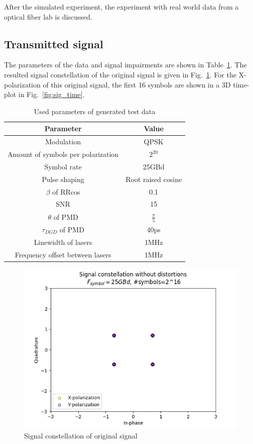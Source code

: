 \documentclass[journal,10pt,twoside, a4paper]{IEEEtran}
\begin{document}
After the simulated experiment, the experiment with real world data from a optical fiber lab is discussed.

\subsection{Transmitted signal}
The parameters of the data and signal impairments are shown in Table~\ref{tab:parameters}. The resulted signal constellation of the original signal is given in Fig.~\ref{fig:sig}. For the X-polarization of this original signal, the first 16 symbols are shown in a 3D time-plot in Fig.~\ref{fig:sig_time}.

\begin{table}
    \centering
    \caption{Used parameters of generated test data}
    \label{tab:parameters}
    \begin{tabular}{c|c}
        Parameter & Value\\
        \hline
        Modulation & QPSK\\
        Amount of symbols per polarization & $2^{20}$\\
        Symbol rate & 25GBd\\
        Pulse shaping & Root raised cosine\\
        $\beta$ of RRcos & 0.1\\
        SNR & 15\\
        $\theta$ of PMD & $\frac{\pi}{5}$\\
        $\tau_{DGD}$ of PMD & 40ps\\
        Linewidth of lasers & 1MHz\\
        Frequency offset between lasers & 1MHz\\
    \end{tabular}
\end{table}

\begin{figure}
    \centering
    \includegraphics[width=\linewidth]{Thesis/images/sig.png}
    \caption{Signal constellation of original signal}
    \label{fig:sig}
\end{figure}
\end{document}

